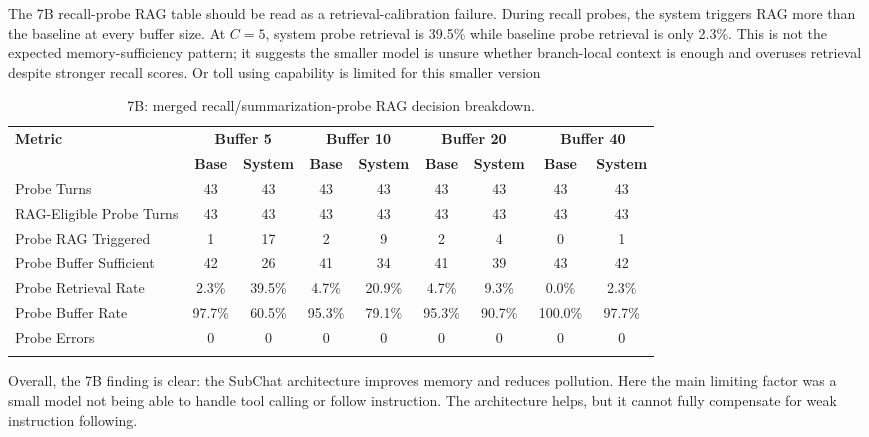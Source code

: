 \documentclass[pdflatex,sn-mathphys-num]{sn-jnl}%
\theoremstyle{thmstyleone}%
\theoremstyle{thmstyletwo}%
\theoremstyle{thmstylethree}%
\begin{document}
The 7B recall-probe RAG table should be read as a retrieval-calibration failure. During recall probes, the system triggers RAG more than the baseline at every buffer size. At $C=5$, system probe retrieval is 39.5\% while baseline probe retrieval is only 2.3\%. This is not the expected memory-sufficiency pattern; it suggests the smaller model is unsure whether branch-local context is enough and overuses retrieval despite stronger recall scores. Or toll using capability is limited for this smaller version

\begin{table}[htbp]
\caption{7B: merged recall/summarization-probe RAG decision breakdown.}\label{tab:7b_rag_main}
\centering
\tiny
\setlength{\tabcolsep}{2.2pt}
\begin{adjustbox}{width=\textwidth}
\begin{tabular}{lcccccccc}
\toprule
\textbf{Metric} & \multicolumn{2}{c}{\textbf{Buffer 5}} & \multicolumn{2}{c}{\textbf{Buffer 10}} & \multicolumn{2}{c}{\textbf{Buffer 20}} & \multicolumn{2}{c}{\textbf{Buffer 40}} \\
\cmidrule(lr){2-3}\cmidrule(lr){4-5}\cmidrule(lr){6-7}\cmidrule(lr){8-9}
 & \textbf{Base} & \textbf{System} & \textbf{Base} & \textbf{System} & \textbf{Base} & \textbf{System} & \textbf{Base} & \textbf{System} \\
\midrule
Probe Turns & 43 & 43 & 43 & 43 & 43 & 43 & 43 & 43 \\
RAG-Eligible Probe Turns & 43 & 43 & 43 & 43 & 43 & 43 & 43 & 43 \\
Probe RAG Triggered & 1 & 17 & 2 & 9 & 2 & 4 & 0 & 1 \\
Probe Buffer Sufficient & 42 & 26 & 41 & 34 & 41 & 39 & 43 & 42 \\
Probe Retrieval Rate & 2.3\% & 39.5\% & 4.7\% & 20.9\% & 4.7\% & 9.3\% & 0.0\% & 2.3\% \\
Probe Buffer Rate & 97.7\% & 60.5\% & 95.3\% & 79.1\% & 95.3\% & 90.7\% & 100.0\% & 97.7\% \\
Probe Errors & 0 & 0 & 0 & 0 & 0 & 0 & 0 & 0 \\
\botrule
\end{tabular}
\end{adjustbox}
\end{table}

Overall, the 7B finding is clear: the SubChat architecture improves memory and reduces pollution. Here the main limiting factor was a small model not being able to handle tool calling or follow instruction. The architecture helps, but it cannot fully compensate for weak instruction following.
\end{document}
